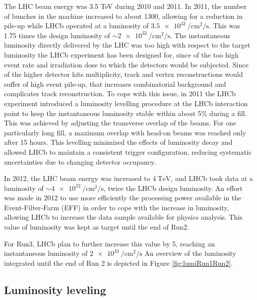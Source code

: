The LHC beam energy was 3.5 TeV during 2010 and 2011. In 2011, the number of bunches in the machine increased to about 1300, allowing for a reduction in pile-up while LHCb operated at a luminosity of $\SI{3.5e32}{\per\centi\meter\squared\per\second}$. This was 1.75 times the design luminosity of $\sim \SI{2e32}{\per\centi\meter\squared\per\second}$. The instantaneous luminosity directly delivered by the LHC was too high with respect to the target luminosity the LHCb experiment has been designed for, since of the too high event rate and irradiation dose to which the detectors would be subjected. Since of the higher detector hits multiplicity, track and vertex reconstructions would suffer of high event pile-up, that increases combinatorial background and complicates track reconstruction.
To cope with this issue, in 2011 the LHCb experiment introduced a luminosity levelling procedure at the LHCb interaction point to keep the instantaneous luminosity stable within about 5\% during a fill. This was achieved by adjusting the transverse overlap of the beams. For one particularly long fill, a maximum overlap with head-on beams was reached only after 15 hours. This levelling minimized the effects of luminosity decay and allowed LHCb to maintain a consistent trigger configuration, reducing systematic uncertainties due to changing detector occupancy.

In 2012, the LHC beam energy was increased to $\SI{4}{\tera\eV}$, and LHCb took data at a luminosity of $\sim \SI{4e32}{\per\centi\meter\squared\per\second}$, twice the LHCb design luminosity. An effort was made in 2012 to use more efficiently the processing power available in the Event-Filter-Farm (EFF) in order to cope with the increase in luminosity, allowing LHCb to increase the data sample available for physics analysis. This value of luminosity was kept as target until the end of Run2. 


For Run3, LHCb plan to further increase this value by 5, reaching an instantaneous luminosity of $\SI{2e33}{\per\centi\meter\squared\per\second}$
An overview of the luminosity integrated until the end of Run 2 is depicted in Figure \ref{fig:lumiRun1Run2}.

\subsection{Luminosity leveling}

